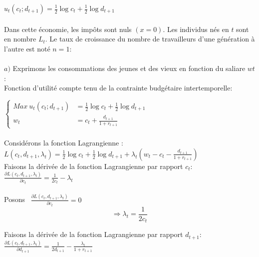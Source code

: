 \documentclass[11pt,twoside,a4paper]{article}
\begin{document}
$u_t(c_t; d_{t+1})=\frac{1}{2}\log{c_t} + \frac{1}{2}\log{d_{t+1}}$\\ \\


Dans cette économie, les impôts sont nuls $(x = 0)$. Les individus nés en $t$
sont en nombre $L_t$. Le taux de croissance du nombre de travailleurs d'une
génération à l'autre est noté $n = 1$:\\ \\
$a)$ Exprimons les consommations des jeunes et des vieux en fonction du saliare
$wt$:\\

Fonction d'utilité compte tenu de la contrainte budgétaire intertemporelle:

$ \left\{\begin{array}{rl}
 Max \ u_t(c_t; d_{t+1}) &=  \frac{1}{2}\log{c_t} + \frac{1}{2}\log{d_{t+1}} \\
 
w_t & =  c_t + \frac{d_{t+1}}{1+r_{t+1}}\end{array}\right. $  \\ \\
Considérons la fonction Lagrangienne :\\

$ L(c_t,d_{t+1},\lambda_t)= \frac{1}{2}\log{c_t} + \frac{1}{2}\log{d_{t+1}} +\lambda_t(w_t-c_t - \frac{d_{t+1}}{1+r_{t+1}})  $  \\

Faisons la dérivée de la fonction Lagrangienne par rapport $c_t :  $ \\

$
\frac{\partial L(c_t,d_{t+1},\lambda_t)}{\partial c_t} = \frac{1}{2c_t} - \lambda_t 
$ \\ \\

Posons  \ $ \frac{\partial L(c_t,d_{t+1},\lambda_t)}{\partial c_t} = 0  $ \\



\begin{equation}\label{eq:test1}
  \Rightarrow \lambda_t=\frac{1}{2c_t}
\end{equation} 


Faisons la dérivée de la fonction Lagrangienne par rapport $d_{t+1} : $\\ 

$
\frac{\partial L(c_t,d_{t+1},\lambda_t)}{\partial d_{t+1}} = \frac{1}{2 d_{t+1}} - \frac{\lambda_t}{1+r_{t+1}} 
$\\ \\
\end{document}
